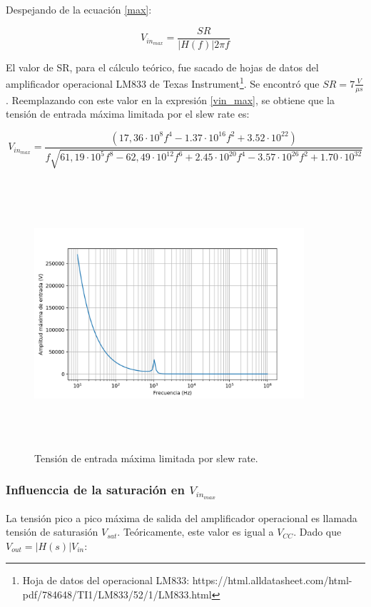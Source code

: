 Despejando de la ecuaci\'on \ref{max}:

\begin{equation}
V_{in_{max}}  = \frac{SR}{\rvert H(f)\rvert 2\pi f}
\label{vinmax}
\end{equation}

El valor de SR, para el c\'alculo te\'orico, fue sacado de hojas de datos del amplificador operacional LM833 de Texas Instrument\footnote{Hoja de datos del operacional LM833: https://html.alldatasheet.com/html-pdf/784648/TI1/LM833/52/1/LM833.html}. 
Se encontr\'o que $SR = 7 \frac{V}{\mu s}$. Reemplazando con este valor en la expresi\'on \ref{vin_max}, se obtiene que la tensi\'on de entrada m\'axima limitada por el slew rate es:

\begin{equation}
V_{in_{max}}  = \frac{\left(17,36 \cdot 10^8 f^{4} - 1.37 \cdot 10^{16} f^{2} + 3.52 \cdot 10^{22}\right)}{f \sqrt{61,19 \cdot 10^5 f^{8} - 62,49 \cdot 10^{12} f^{6} + 2.45 \cdot 10^{20} f^{4} - 3.57 \cdot 10^{26} f^{2} + 1.70 \cdot 10^{32}}}		
\label{vin_max}
\end{equation}


\begin{figure}[H] %
	\centering
	\includegraphics[width=10cm,height=10cm,keepaspectratio]{../EJ1/00GRAFICOS/vinmaxsr.png}
	\caption{Tensi\'on de entrada m\'axima limitada por slew rate.}
	\label{vinmaxsr}
\end{figure}

\subsubsection*{Influenccia de la saturaci\'on en $V_{in_{max}}$}
La tensi\'on pico a pico m\'axima de salida del amplificador operacional es llamada 
tensi\'on de saturasi\'on $V_{sat}$. Te\'oricamente, este valor es igual a $V_{CC}$. Dado que $V_{out} = \rvert H(s) \rvert V_{in}$:

